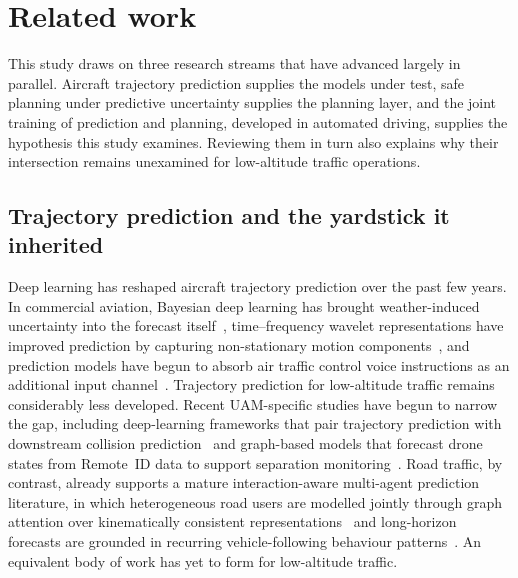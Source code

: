 \documentclass[11pt]{article}
\theoremstyle{plain}
\theoremstyle{definition}
\begin{document}
\section{Related work}
\label{sec:related}

This study draws on three research streams that have advanced largely
in parallel. Aircraft trajectory prediction supplies the models under
test, safe planning under predictive uncertainty supplies the planning
layer, and the joint training of prediction and planning, developed in
automated driving, supplies the hypothesis this study examines.
Reviewing them in turn also explains why their intersection remains
unexamined for low-altitude traffic operations.

\subsection{Trajectory prediction and the yardstick it inherited}
\label{sec:related-prediction}

Deep learning has reshaped aircraft trajectory prediction over the
past few years. In commercial aviation, Bayesian deep learning has
brought weather-induced uncertainty into the forecast
itself~\citep{pang2021data}, time--frequency wavelet
representations have improved prediction by capturing non-stationary
motion components~\citep{zhang2023flight}, and prediction models have
begun to absorb air traffic control voice instructions as an
additional input channel~\citep{guo2024integrating}. Trajectory prediction
for low-altitude traffic remains considerably less developed. Recent
UAM-specific studies have begun to narrow the gap, including
deep-learning frameworks that pair trajectory prediction with
downstream collision prediction~\citep{kim2025dlcollision} and
graph-based models that forecast drone states from Remote~ID data to
support separation monitoring~\citep{wen2025bidgcnllm}. Road traffic,
by contrast, already supports a mature interaction-aware multi-agent
prediction literature, in which heterogeneous road users are modelled
jointly through graph attention over kinematically consistent
representations~\citep{sheng2024kinematics} and long-horizon forecasts
are grounded in recurring vehicle-following behaviour
patterns~\citep{an2025longterm}. An equivalent body of work has yet to
form for low-altitude traffic.
\end{document}
